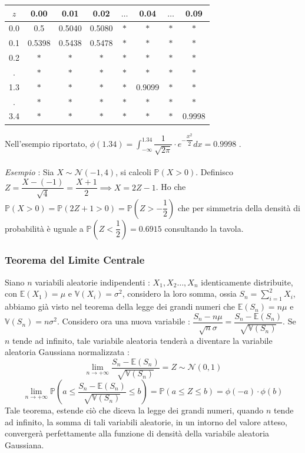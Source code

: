 \documentclass[12pt, letterpaper]{article}
\newcommand{\E}{{\mathbb E}}
\newcommand{\V}{{\mathbb V}}
\newcommand{\acc}{\\\hphantom{}\\}
\newcommand{\Prob}{{\mathbb P}}
\begin{document}
\begin{center}
    \begin{tabular}{|c|c|c|c|c|c|c|c|}
        \hline
        \(z\) & 0.00   & \cellcolor[HTML]{FFFFFF}0.01 & 0.02   & \(\dots\) & 0.04                           & \(\dots\) & 0.09   \\ \hline
        0.0   & 0.5    & 0.5040                       & 0.5080 & \(*\)     & \(*\)                          & \(*\)     & \(*\)  \\ \hline
        0.1   & 0.5398 & 0.5438                       & 0.5478 & \(*\)     & \(*\)                          & \(*\)     & \(*\)  \\ \hline
        0.2   & \(*\)  & \(*\)                        & \(*\)  & \(*\)     & \(*\)                          & \(*\)     & \(*\)  \\ \hline
        .     & \(*\)  & \(*\)                        & \(*\)  & \(*\)     & \(*\)                          & \(*\)     & \(*\)  \\ \hline
        1.3   & \(*\)  & \(*\)                        & \(*\)  & \(*\)     & \cellcolor[HTML]{FFCCC9}0.9099 & \(*\)     & \(*\)  \\ \hline
        .     & \(*\)  & \(*\)                        & \(*\)  & \(*\)     & \(*\)                          & \(*\)     & \(*\)  \\ \hline
        3.4   & \(*\)  & \(*\)                        & \(*\)  & \(*\)     & \(*\)                          & \(*\)     & 0.9998 \\ \hline
        \end{tabular}
\end{center}
Nell'esempio riportato, \(\phi(1.34)=\displaystyle\int_{-\infty}^{1.34} \dfrac{1}{\sqrt{2\pi}}\cdot e^{-\dfrac{x^2}{2}}dx=0.9998\) .\acc 
\textit{Esempio} : Sia \(X\sim \mathcal{N}(-1,4)\), si calcoli \(\Prob(X>0)\). Definisco \(Z=\dfrac{X-(-1)}{\sqrt{4}}
=\dfrac{X+1}{2}\implies X=2Z-1\). Ho che \(\Prob(X>0)=\Prob(2Z+1>0)=\Prob(Z>-\dfrac{1}{2})\) che 
per simmetria della densità di probabilità è uguale a \(\Prob(Z<\dfrac{1}{2})=0.6915\) consultando la tavola.
\subsubsection{Teorema del Limite Centrale}
Siano \(n\) variabili aleatorie indipendenti : \(X_1,X_2\dots,X_n\) identicamente distribuite, 
con \(\E(X_1)=\mu\) e \(\V(X_i)=\sigma^2\), considero la loro somma, ossia \(S_n=\displaystyle
\sum_{i=1}^2X_i\), abbiamo già visto nel teorema della legge dei grandi numeri 
che \(\E(S_n)=n\mu\) e \(\V(S_n)=n\sigma^2\). Considero ora una nuova variabile : \(\dfrac{S_n-n\mu}{\sqrt{n}\sigma}=
\dfrac{S_n-\E(S_n)}{\sqrt{\V(S_n)}}\). Se \(n\) tende ad infinito, tale variabile aleatoria tenderà 
a diventare la variabile aleatoria Gaussiana normalizzata : 
$$\lim_{n\rightarrow +\infty}\dfrac{S_n-\E(S_n)}{\sqrt{\V(S_n)}}=Z\sim\mathcal{N}(0,1)$$
$$\lim_{n\rightarrow +\infty}\Prob(a\le \dfrac{S_n-\E(S_n)}{\sqrt{\V(S_n)}}\le b)=\Prob(a\le Z\le b)=\phi(-a)\cdot \phi(b)$$
Tale teorema, estende ciò che diceva la legge dei grandi numeri, quando \(n\) tende ad infinito, 
la somma di tali variabili aleatorie, in un intorno del valore atteso, convergerà perfettamente 
alla funzione di densità della variabile aleatoria Gaussiana.
\end{document}
